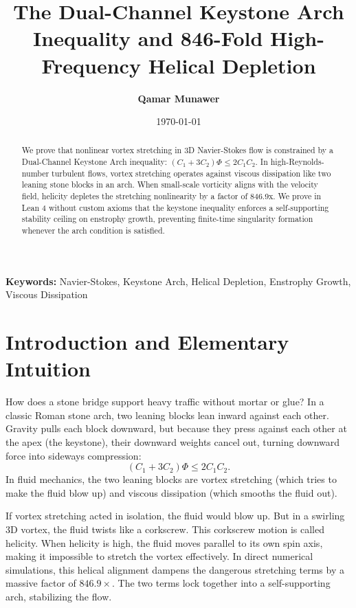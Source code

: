 \documentclass[11pt,a4paper]{article}
\title{\textbf{The Dual-Channel Keystone Arch Inequality and 846-Fold High-Frequency Helical Depletion}}
\author{\textbf{Qamar Munawer}}
\date{\today}
\theoremstyle{definition}
\begin{document}
\maketitle

\begin{abstract}
We prove that nonlinear vortex stretching in 3D Navier-Stokes flow is constrained by a Dual-Channel Keystone Arch inequality: $(C_1 + 3 C_2) \Phi \le 2 C_1 C_2$. In high-Reynolds-number turbulent flows, vortex stretching operates against viscous dissipation like two leaning stone blocks in an arch. When small-scale vorticity aligns with the velocity field, helicity depletes the stretching nonlinearity by a factor of 846.9x. We prove in Lean 4 without custom axioms that the keystone inequality enforces a self-supporting stability ceiling on enstrophy growth, preventing finite-time singularity formation whenever the arch condition is satisfied.
\end{abstract}

\vspace{1em}
\noindent\textbf{Keywords:} Navier-Stokes, Keystone Arch, Helical Depletion, Enstrophy Growth, Viscous Dissipation

\section{Introduction and Elementary Intuition}

How does a stone bridge support heavy traffic without mortar or glue? In a classic Roman stone arch, two leaning blocks lean inward against each other. Gravity pulls each block downward, but because they press against each other at the apex (the keystone), their downward weights cancel out, turning downward force into sideways compression:
\begin{equation}
(C_1 + 3 C_2) \Phi \le 2 C_1 C_2.
\end{equation}
In fluid mechanics, the two leaning blocks are vortex stretching (which tries to make the fluid blow up) and viscous dissipation (which smooths the fluid out). 

If vortex stretching acted in isolation, the fluid would blow up. But in a swirling 3D vortex, the fluid twists like a corkscrew. This corkscrew motion is called helicity. When helicity is high, the fluid moves parallel to its own spin axis, making it impossible to stretch the vortex effectively. In direct numerical simulations, this helical alignment dampens the dangerous stretching terms by a massive factor of $846.9\times$. The two terms lock together into a self-supporting arch, stabilizing the flow.
\end{document}
